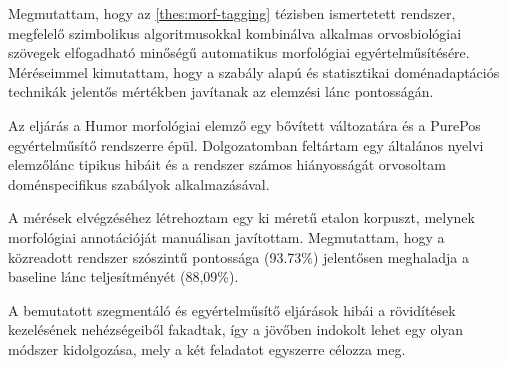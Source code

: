 \thesisline%

\begin{core}
\begin{thesis}%
\label{thes:clin-pos}
Megmutattam, hogy az \ref{thes:morf-tagging} tézisben ismertetett rendszer, megfelelő szimbolikus algoritmusokkal kombinálva alkalmas orvosbiológiai szövegek elfogadható minőségű automatikus morfológiai egyértelműsítésére. 
Méréseimmel kimutattam, hogy a szabály alapú és statisztikai doménadaptációs technikák jelentős mértékben javítanak az elemzési lánc pontosságán.
\end{thesis}

\begin{pub}
\cite{Orosz2013,Orosz2014b} 
\end{pub}
\end{core}

Az eljárás a Humor morfológiai elemző egy bővített változatára és a PurePos egyértelműsítő rendszerre épül. 
Dolgozatomban feltártam egy általános nyelvi elemzőlánc tipikus hibáit és a rendszer számos hiányosságát orvosoltam doménspecifikus szabályok alkalmazásával. 

A mérések elvégzéséhez létrehoztam egy ki méretű etalon korpuszt, melynek morfológiai annotációját manuálisan javítottam. 
Megmutattam, hogy a közreadott rendszer szószintű pontossága (93.73\%) jelentősen meghaladja a baseline lánc teljesítményét (88,09\%). 

A bemutatott szegmentáló és egyértelműsítő eljárások hibái a rövidítések kezelésének nehézségeiből fakadtak, így a jövőben indokolt lehet egy olyan módszer kidolgozása, mely a két feladatot egyszerre célozza meg.

\let\thesubsection=\oldthesubsection
